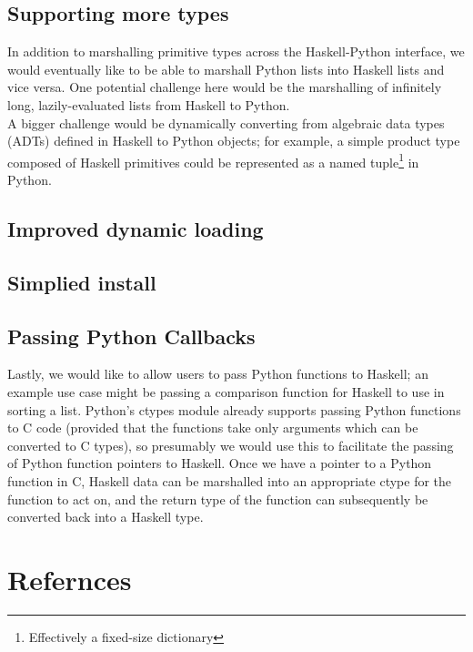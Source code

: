 \documentclass[11pt, letterpaper, oneside, twocolumn] {article}
\begin{document}
\subsection{Supporting more types}
In addition to marshalling primitive types across the Haskell-Python interface, we would eventually like to be able to marshall Python lists into Haskell lists and vice versa. One potential challenge here would be the marshalling of infinitely long, lazily-evaluated lists from Haskell to Python. \\
A bigger challenge would be dynamically converting from algebraic data types (ADTs) defined in Haskell to Python objects; for example, a simple product type composed of Haskell primitives could be represented as a named tuple\footnote{Effectively a fixed-size dictionary} in Python.

\subsection{Improved dynamic loading}


\subsection{Simplied install}


\subsection{Passing Python Callbacks}
Lastly, we would like to allow users to pass Python functions to Haskell; an example use case might be passing a comparison function for Haskell to use in sorting a list. Python's ctypes module already supports passing Python functions to C code (provided that the functions take only arguments which can be converted to C types), so presumably we would use this to facilitate the passing of Python function pointers to Haskell. Once we have a pointer to a Python function in C, Haskell data can be marshalled into an appropriate ctype for the function to act on, and the return type of the function can subsequently be converted back into a Haskell type.
\section{Refernces}

\end{document}
